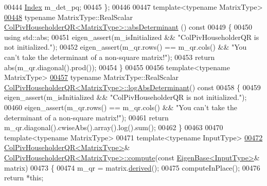 \begin{DoxyCode}
00444     \hyperlink{namespace_eigen_a62e77e0933482dafde8fe197d9a2cfde}{Index} m\_det\_pq;
00445 \};
00446 
00447 \textcolor{keyword}{template}<\textcolor{keyword}{typename} MatrixType>
\hyperlink{group___q_r___module_ac87c3bf42098d6f7324dafbc50fa83f7}{00448} \textcolor{keyword}{typename} MatrixType::RealScalar \hyperlink{group___q_r___module_ac87c3bf42098d6f7324dafbc50fa83f7}{ColPivHouseholderQR<MatrixType>::absDeterminant}
      ()\textcolor{keyword}{ const}
00449 \textcolor{keyword}{}\{
00450   \textcolor{keyword}{using} std::abs;
00451   eigen\_assert(m\_isInitialized && \textcolor{stringliteral}{"ColPivHouseholderQR is not initialized."});
00452   eigen\_assert(m\_qr.rows() == m\_qr.cols() && \textcolor{stringliteral}{"You can't take the determinant of a non-square matrix!"});
00453   \textcolor{keywordflow}{return} abs(m\_qr.diagonal().prod());
00454 \}
00455 
00456 \textcolor{keyword}{template}<\textcolor{keyword}{typename} MatrixType>
\hyperlink{group___q_r___module_afdc29438a335871f67449c253369ce12}{00457} \textcolor{keyword}{typename} MatrixType::RealScalar 
      \hyperlink{group___q_r___module_afdc29438a335871f67449c253369ce12}{ColPivHouseholderQR<MatrixType>::logAbsDeterminant}()\textcolor{keyword}{
       const}
00458 \textcolor{keyword}{}\{
00459   eigen\_assert(m\_isInitialized && \textcolor{stringliteral}{"ColPivHouseholderQR is not initialized."});
00460   eigen\_assert(m\_qr.rows() == m\_qr.cols() && \textcolor{stringliteral}{"You can't take the determinant of a non-square matrix!"});
00461   \textcolor{keywordflow}{return} m\_qr.diagonal().cwiseAbs().array().log().sum();
00462 \}
00463 
00470 \textcolor{keyword}{template}<\textcolor{keyword}{typename} MatrixType>
00471 \textcolor{keyword}{template}<\textcolor{keyword}{typename} InputType>
\hyperlink{group___q_r___module_a768c98c092250c9e319c3298b05f0f2d}{00472} \hyperlink{group___q_r___module}{ColPivHouseholderQR<MatrixType>}& 
      \hyperlink{group___q_r___module_class_eigen_1_1_col_piv_householder_q_r}{ColPivHouseholderQR<MatrixType>::compute}(\textcolor{keyword}{const} 
      \hyperlink{group___core___module_struct_eigen_1_1_eigen_base}{EigenBase<InputType>}& matrix)
00473 \{
00474   m\_qr = matrix.\hyperlink{group___core___module_a324b16961a11d2ecfd2d1b7dd7946545}{derived}();
00475   computeInPlace();
00476   \textcolor{keywordflow}{return} *\textcolor{keyword}{this};

\end{DoxyCode}
